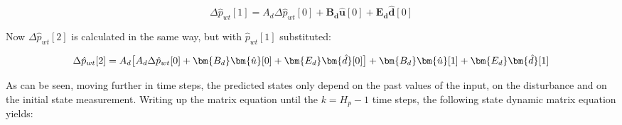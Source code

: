 
\begin{equation}
	\Delta \hat p_{wt}[1] = A_d\Delta \hat p_{wt}[0] + \bm{B_d} \bm{\hat{u}}[0] + \bm{E_d} \bm{\hat{d}}[0]
\end{equation}

Now $\Delta \hat p_{wt}[2]$ is calculated in the same way, but with $\hat p_{wt}[1]$ substituted: 

\begin{equation}
	\Delta \hat p_{wt}[2] = A_d\big[A_d\Delta \hat p_{wt}[0] + \bm{B_d}  \bm{\hat{u}}[0] + \bm{E_d}  \bm{\hat{d}}[0]\big] + \bm{B_d} \bm{\hat{u}}[1] + \bm{E_d} \bm{\hat{d}}[1]\\ 
\end{equation}

As can be seen, moving further in time steps, the predicted states only depend on the past values of the input, on the disturbance and on the initial state measurement. Writing up the matrix equation until the $k = H_p - 1$ time steps, the following state dynamic matrix equation yields:

